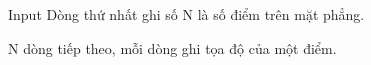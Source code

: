 Input
Dòng thứ nhất ghi số N là số điểm trên mặt phẳng.  

   N dòng tiếp theo, mỗi dòng ghi tọa độ của một điểm.